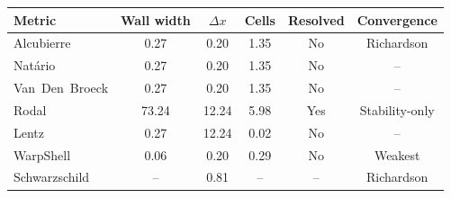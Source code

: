 \begin{tabular}{@{}lccccc@{}}
    \toprule
    Metric & Wall width & $\Delta x$ & Cells & Resolved & Convergence \\
    \midrule
    Alcubierre & 0.27 & 0.20 & 1.35 & No & Richardson \\
    Nat\'ario & 0.27 & 0.20 & 1.35 & No & -- \\
    Van~Den~Broeck & 0.27 & 0.20 & 1.35 & No & -- \\
    Rodal & 73.24 & 12.24 & 5.98 & Yes & Stability-only \\
    \midrule
    Lentz & 0.27 & 12.24 & 0.02 & No & -- \\
    \midrule
    WarpShell & 0.06 & 0.20 & 0.29 & No & Weakest \\
    \midrule
    Schwarzschild & -- & 0.81 & -- & -- & Richardson \\
    \bottomrule
\end{tabular}
